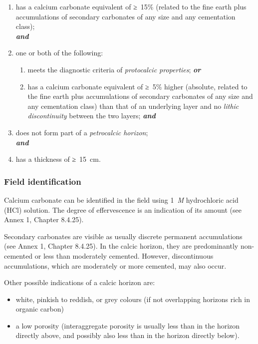 \documentclass[
  letterpaper,
  DIV=11,
  numbers=noendperiod]{scrreprt}
\providecommand{\tightlist}{%
  \setlength{\itemsep}{0pt}\setlength{\parskip}{0pt}}\usepackage{longtable,booktabs,array}
\begin{document}
\begin{enumerate}
\def\labelenumi{\arabic{enumi}.}
\item
  has a calcium carbonate equivalent of ≥~15\% (related to the fine
  earth plus accumulations of secondary carbonates of any size and any
  cementation class);\\
  \textbf{\emph{and}}
\item
  one or both of the following:

  \begin{enumerate}
  \def\labelenumii{\alph{enumii}.}
  \tightlist
  \item
    meets the diagnostic criteria of \emph{protocalcic properties};
    \textbf{\emph{or}}
  \item
    has a calcium carbonate equivalent of ≥~5\% higher (absolute,
    related to the fine earth plus accumulations of secondary carbonates
    of any size and any cementation class) than that of an underlying
    layer and no \emph{lithic discontinuity} between the two layers;
    \textbf{\emph{and}}
  \end{enumerate}
\item
  does not form part of a \emph{petrocalcic horizon};\\
  \textbf{\emph{and}}
\item
  has a thickness of ≥~15~cm.
\end{enumerate}

\hypertarget{field-identification-2}{%
\subsubsection{Field identification}\label{field-identification-2}}

Calcium carbonate can be identified in the field using 1~\emph{M}
hydrochloric acid (HCl) solution. The degree of effervescence is an
indication of its amount (see Annex 1, Chapter 8.4.25).

Secondary carbonates are visible as usually discrete permanent
accumulations (see Annex 1, Chapter 8.4.25). In the calcic horizon, they
are predominantly non-cemented or less than moderately cemented.
However, discontinuous accumulations, which are moderately or more
cemented, may also occur.

Other possible indications of a calcic horizon are:

\begin{itemize}
\tightlist
\item
  white, pinkish to reddish, or grey colours (if not overlapping
  horizons rich in organic carbon)
\item
  a low porosity (interaggregate porosity is usually less than in the
  horizon directly above, and possibly also less than in the horizon
  directly below).
\end{itemize}
\end{document}
